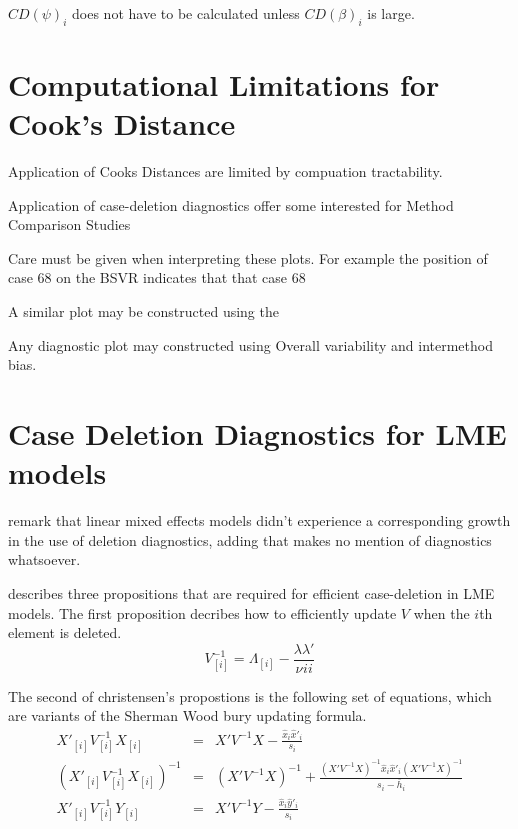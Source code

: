 \documentclass[12pt, a4paper]{report}
\theoremstyle{plain}
\theoremstyle{definition}
\theoremstyle{remark}
\begin{document}
$CD(\psi)_i$ does not have to be calculated unless $CD(\beta)_i$ is large.










\section{Computational Limitations for Cook's Distance}
Application of Cooks Distances are limited by compuation tractability.


Application of case-deletion diagnostics offer some interested for Method Comparison Studies


Care must be given when interpreting these plots. For example the position of case 68 on the BSVR indicates that that
case 68 

A similar plot may be constructed using the

Any diagnostic plot may constructed using Overall variability and intermethod bias.



\section{Case Deletion Diagnostics for LME models}

\citet{HaslettDillane} remark that linear mixed effects models
didn't experience a corresponding growth in the use of deletion
diagnostics, adding that \citet{McCullSearle} makes no mention of
diagnostics whatsoever.

\citet{Christensen} describes three propositions that are required
for efficient case-deletion in LME models. The first proposition
decribes how to efficiently update $V$ when the $i$th element is
deleted.
\begin{equation}
	V_{[i]}^{-1} = \Lambda_{[i]} - \frac{\lambda
		\lambda\prime}{\nu^{}ii}
\end{equation}

The second of christensen's propostions is the following set of
equations, which are variants of the Sherman Wood bury updating
formula.
\begin{eqnarray}
	X'_{[i]}V_{[i]}^{-1}X_{[i]} &=& X' V^{-1}X -
	\frac{\hat{x}_{i}\hat{x}'_{i}}{s_{i}}\\
	(X'_{[i]}V_{[i]}^{-1}X_{[i]})^{-1} &=& (X' V^{-1}X)^{-1} +
	\frac{(X' V^{-1}X)^{-1}\hat{x}_{i}\hat{x}' _{i}
		(X' V^{-1}X)^{-1}}{s_{i}- \bar{h}_{i}}\\
	X'_{[i]}V_{[i]}^{-1}Y_{[i]} &=& X\prime V^{-1}Y -
	\frac{\hat{x}_{i}\hat{y}' _{i}}{s_{i}}
\end{eqnarray}
\end{document}
